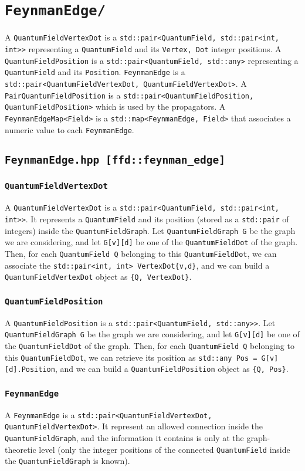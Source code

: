 \chapter{\texttt{FeynmanEdge/}}
A \texttt{QuantumFieldVertexDot} is a \texttt{std::pair<QuantumField, std::pair<int, int>>} representing a \texttt{QuantumField} and its \texttt{{Vertex, Dot}} integer positions. A \texttt{QuantumFieldPosition} is a \texttt{std::pair<QuantumField, std::any>} representing a \texttt{QuantumField} and its \texttt{Position}.
\texttt{FeynmanEdge} is a \texttt{std::pair<QuantumFieldVertexDot, QuantumFieldVertexDot>}. A \texttt{PairQuantumFieldPosition} is a \texttt{std::pair<QuantumFieldPosition, QuantumFieldPosition>} which is used by the propagators. A \texttt{FeynmanEdgeMap<Field>} is a \texttt{std::map<FeynmanEdge, Field>} that associates a numeric value to each \texttt{FeynmanEdge}.
\section{\texttt{FeynmanEdge.hpp [ffd::feynman\_edge]}}
\subsection{\texttt{QuantumFieldVertexDot}}
A \texttt{QuantumFieldVertexDot} is a \texttt{std::pair<QuantumField, std::pair<int, int>>}. It represents a \texttt{QuantumField} and its position (stored as a \texttt{std::pair} of integers) inside the \texttt{QuantumFieldGraph}. Let \texttt{QuantumFieldGraph G} be the graph we are considering, and let \texttt{G[v][d]} be one of the \texttt{QuantumFieldDot} of the graph. Then, for each \texttt{QuantumField Q} belonging to this \texttt{QuantumFieldDot}, we can associate the \texttt{std::pair<int, int> VertexDot\{v,d\}}, and we can build a \texttt{QuantumFieldVertexDot} object as \texttt{\{Q, VertexDot\}}.
\subsection{\texttt{QuantumFieldPosition}}
A \texttt{QuantumFieldPosition} is a \texttt{std::pair<QuantumField, std::any>>}. Let \texttt{QuantumFieldGraph G} be the graph we are considering, and let \texttt{G[v][d]} be one of the \texttt{QuantumFieldDot} of the graph. Then, for each \texttt{QuantumField Q} belonging to this \texttt{QuantumFieldDot}, we can retrieve its position as \texttt{std::any Pos = G[v][d].Position}, and we can build a \texttt{QuantumFieldPosition} object as \texttt{\{Q, Pos\}}.
\subsection{\texttt{FeynmanEdge}}
A \texttt{FeynmanEdge} is a \texttt{std::pair<QuantumFieldVertexDot, QuantumFieldVertexDot>}. It represent an allowed connection inside the \texttt{QuantumFieldGraph}, and the information it contains is only at the graph-theoretic level (only the integer positions of the connected \texttt{QuantumField} inside the \texttt{QuantumFieldGraph} is known).
